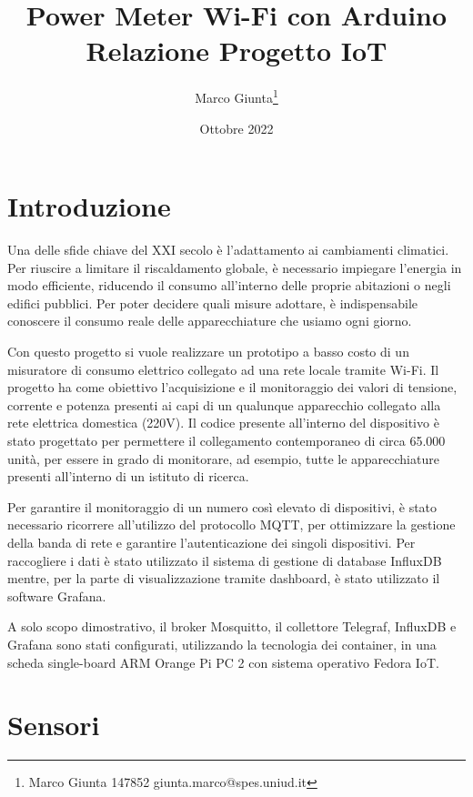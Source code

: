 \documentclass[italian,12pt,a4paper,oneside,final]{report}
\title{\huge Power Meter Wi-Fi con Arduino\\[0.5em]
\large Relazione Progetto IoT}
\date{Ottobre 2022}
\author{
Marco Giunta\thanks{Marco Giunta 147852 giunta.marco@spes.uniud.it}}
\begin{document}
\maketitle

\tableofcontents

\newpage

\section{Introduzione}
Una delle sfide chiave del XXI secolo è l’adattamento ai cambiamenti climatici.
Per riuscire a limitare il riscaldamento globale, è necessario impiegare l’energia in modo efficiente, riducendo il consumo all'interno delle proprie abitazioni o negli edifici pubblici.
Per poter decidere quali misure adottare, è indispensabile conoscere il consumo reale delle apparecchiature che usiamo ogni giorno.

Con questo progetto si vuole realizzare un prototipo a basso costo di un misuratore di consumo elettrico collegato ad una rete locale tramite Wi-Fi.
Il progetto ha come obiettivo l’acquisizione e il monitoraggio dei valori di tensione, corrente e potenza presenti ai capi di un qualunque apparecchio collegato alla rete elettrica domestica (220V).
Il codice presente all'interno del dispositivo è stato progettato per permettere il collegamento contemporaneo di circa 65.000 unità, per essere in grado di monitorare, ad esempio, tutte le apparecchiature presenti all'interno di un istituto di ricerca.

Per garantire il monitoraggio di un numero così elevato di dispositivi, è stato necessario ricorrere all'utilizzo del protocollo MQTT, per ottimizzare la gestione della banda di rete e garantire l'autenticazione dei singoli dispositivi.
Per raccogliere i dati è stato utilizzato il sistema di gestione di database InfluxDB mentre, per la parte di visualizzazione tramite dashboard, è stato utilizzato il software Grafana.

A solo scopo dimostrativo, il broker Mosquitto, il collettore Telegraf, InfluxDB e Grafana sono stati configurati, utilizzando la tecnologia dei container, in una scheda single-board ARM Orange Pi PC 2 con sistema operativo Fedora IoT.
\section{Sensori}
\end{document}
